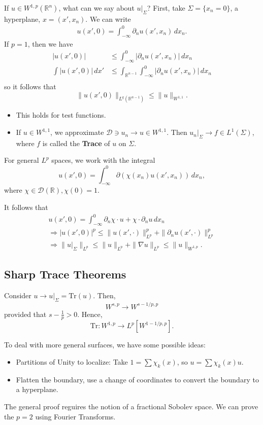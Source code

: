 \documentclass[12pt]{scrartcl}
\newcommand{\R}{\mathbb{R}}
\let \grad \nabla
\begin{document}
If $u \in W^{1, p}(\R^n)$, what can we say about $u \vert_{\Sigma}$?  First, take $\Sigma = \{x_n = 0\}$, a hyperplane, $x = (x', x_n)$.  We can write
\begin{align*}
u(x', 0) = \int_{-\infty}^0 \partial_n u(x', x_n)\, dx_n.
\end{align*}
If $p = 1$, then we have
\begin{align*}
|u(x', 0) | &\le \int_{-\infty}^0 |\partial_n u(x', x_n)| \,dx_n \\
\int |u(x', 0)|\, dx' &\le \int_{\R^{n-1}}\int_{-\infty}^0 |\partial_n u(x', x_n)|\, dx_n\\
\end{align*}
so it follows that 
$$\|u(x', 0)\|_{L^q(\R^{n-1})}\le \|u\|_{W^{1, 1}}.$$
\begin{itemize}
\item This holds for test functions.
\item If $u \in W^{1, 1}$, we approximate $\mathcal D \ni u_n \to u \in W^{1, 1}$.  Then $u_n\vert_\Sigma \to f \in L^1(\Sigma)$, where $f$ is called the \textbf{Trace} of $u$ on $\Sigma$.
\end{itemize}

For general $L^p$ spaces, we work with the integral
$$u(x', 0) = \int_{-\infty}^0 \partial(\chi(x_n) u(x', x_n))\, dx_n,$$
where $\chi \in \mathcal D(\R), \chi(0) = 1$.

It follows that 
\begin{align*}
u(x', 0) = \int_{-\infty}^0 \partial_n \chi \cdot u + \chi \cdot \partial_n u \, dx_n\\
\Longrightarrow |u(x', 0)|^p \le \|u(x', \cdot)\|_{L^p}^p + \|\partial_n u(x', \cdot)\|_{L^p}^p\\
\Longrightarrow \|u\vert_\Sigma\|_{L^p} \le \|u\|_{L^p} + \|\grad u \|_{L^p} \le \|u\|_{W^{1, p}}.
\end{align*}
\subsection{Sharp Trace Theorems}

\begin{thm} Consider $u \to u\vert_\Sigma = \text{Tr}(u)$.  Then,
$$W^{s, p} \to W^{s - 1/p, p}$$
provided that $s - \frac{1}{p} > 0$.  Hence,
$$\text{Tr}: W^{1, p} \to L^p[W^{1 - 1/p, p}].$$
\end{thm}
To deal with more general surfaces, we have some possible ideas:
\begin{itemize}
\item Partitions of Unity to localize:  Take $1 = \sum \chi_k(x)$, so $u = \sum \chi_k(x)u$.
\item Flatten the boundary, use a change of coordinates to convert the boundary to a hyperplane.
\end{itemize}
The general proof reguires the notion of a fractional Sobolev space.  We can prove the $p=2$ using Fourier Transforms.
\end{document}
